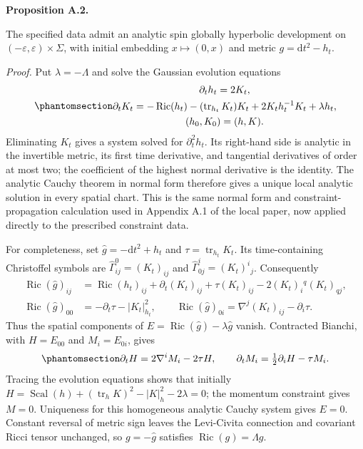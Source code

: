 \documentclass[
  english,
  11pt,
  reqno]{amsart}
\makeatletter
\newcommand{\pandocstatementheading}[1]{%
  \par\addpenalty{\@beginparpenalty}%
  \addvspace{.5\baselineskip plus .2\baselineskip minus .2\baselineskip}%
  {\normalfont\bfseries #1\par}%
  \nobreak\@afterindenttrue\@afterheading
}
\makeatother
\begin{document}
\pandocstatementheading{\protect{}\label{prop:ordinary-analytic-cauchy-collar-v08}Proposition A.2.}

The specified data admit an analytic spin globally hyperbolic
development on \((-\varepsilon,\varepsilon)\times\Sigma\), with initial
embedding \(x\mapsto(0,x)\) and metric \(g=\mathrm dt^2-h_t\).

\emph{Proof.} Put \(\lambda=-\Lambda\) and solve the Gaussian evolution
equations
\begin{equation}\protect\phantomsection\label{eq:ordinary-analytic-gaussian-evolution-v08}{\begin{gathered}
\partial_t h_t=2K_t, \\
\partial_tK_t=-\operatorname{Ric}(h_t)
 -(\operatorname{tr}_{h_t}K_t)K_t
 +2K_th_t^{-1}K_t+\lambda h_t, \\
(h_0,K_0)=(h,K).
\end{gathered}}\end{equation} Eliminating \(K_t\) gives a system solved for
\(\partial_t^2h_t\). Its right-hand side is analytic in the invertible
metric, its first time derivative, and tangential derivatives of order
at most two; the coefficient of the highest normal derivative is the
identity. The analytic Cauchy theorem in normal form therefore gives a
unique local analytic solution in every spatial chart. This is the same
normal form and constraint-propagation calculation used in Appendix A.1
of the local paper, now applied directly to the prescribed constraint
data.

For completeness, set \(\widehat g=-\mathrm dt^2+h_t\) and
\(\tau=\operatorname{tr}_{h_t}K_t\). Its time-containing Christoffel
symbols are \(\widehat\Gamma^0_{ij}=(K_t)_{ij}\) and
\(\widehat\Gamma^i_{0j}=(K_t)^i{}_j\). Consequently \[
\begin{aligned}
\operatorname{Ric}(\widehat g)_{ij}
 &=\operatorname{Ric}(h_t)_{ij}+\partial_t(K_t)_{ij}
   +\tau(K_t)_{ij}-2(K_t)_i{}^q(K_t)_{qj},\\
\operatorname{Ric}(\widehat g)_{00}
 &=-\partial_t\tau-|K_t|_{h_t}^2,
\qquad
\operatorname{Ric}(\widehat g)_{0i}
 =\nabla^j(K_t)_{ij}-\partial_i\tau.
\end{aligned}
\] Thus the spatial components of
\(E=\operatorname{Ric}(\widehat g)-\lambda\widehat g\) vanish.
Contracted Bianchi, with \(H=E_{00}\) and \(M_i=E_{0i}\), gives
\begin{equation}\protect\phantomsection\label{eq:ordinary-analytic-constraint-propagation-v08}{
\partial_tH=2\nabla^iM_i-2\tau H,
\qquad
\partial_tM_i=\tfrac12\partial_iH-\tau M_i.
}\end{equation} Tracing the evolution equations shows that initially
\(H=\operatorname{Scal}(h)+(\operatorname{tr}_hK)^2-|K|_h^2-2\lambda=0\);
the momentum constraint gives \(M=0\). Uniqueness for this homogeneous
analytic Cauchy system gives \(E=0\). Constant reversal of metric sign
leaves the Levi-Civita connection and covariant Ricci tensor unchanged,
so \(g=-\widehat g\) satisfies \(\operatorname{Ric}(g)=\Lambda g\).
\end{document}
